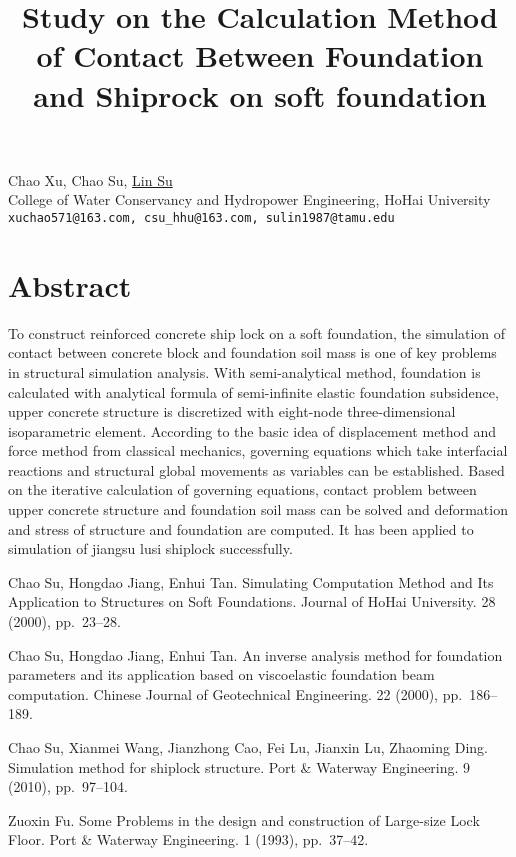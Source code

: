 \title{Study on the Calculation Method of Contact Between Foundation and Shiprock on soft foundation}
\author{} \institute{}
\maketitle

\begin{center}
{\large Chao Xu, Chao Su, \underline{Lin Su}}\\
College of Water Conservancy and Hydropower Engineering, HoHai University\\
{\tt xuchao571@163.com, csu\_hhu@163.com, sulin1987@tamu.edu}
\end{center}

\section*{Abstract}
To construct reinforced concrete ship lock on a soft foundation, the simulation of contact between concrete block and foundation soil mass is one of key problems in structural simulation analysis. With semi-analytical method, foundation is calculated with analytical formula of semi-infinite elastic foundation subsidence, upper concrete structure is discretized with eight-node three-dimensional isoparametric element. According to the basic idea of displacement method and force method from classical mechanics, governing equations which take interfacial reactions and structural global movements as variables can be established. Based on the iterative calculation of governing equations, contact problem between upper concrete structure and foundation soil mass can be solved and deformation and stress of structure and foundation are computed. It has been applied to simulation of jiangsu lusi shiplock successfully.


\begin{thebibliography}{10}
{\sc Chao Su, Hongdao Jiang, Enhui Tan}. {Simulating Computation Method and Its Application to Structures on Soft Foundations}. Journal of HoHai University. 28 (2000), pp.~23--28.

{\sc Chao Su, Hongdao Jiang, Enhui Tan}. {An inverse analysis method for foundation parameters and its application based on viscoelastic foundation beam computation}. Chinese Journal of Geotechnical Engineering. 22 (2000), pp.~186--189.

{\sc Chao Su, Xianmei Wang, Jianzhong Cao, Fei Lu, Jianxin Lu, Zhaoming Ding}. {Simulation method for shiplock structure}. Port \& Waterway Engineering. 9 (2010), pp.~97--104.

{\sc Zuoxin Fu}. {Some Problems in the design and construction of Large-size Lock Floor}. Port \& Waterway Engineering. 1 (1993), pp.~37--42.
\end{thebibliography}
